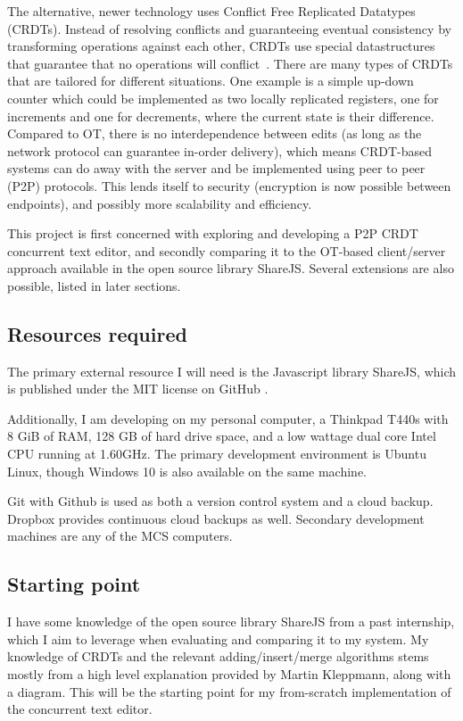 \documentclass[12pt,a4paper,twoside]{article}
\begin{document}
The alternative, newer technology uses Conflict Free Replicated Datatypes (CRDTs). Instead of resolving conflicts and guaranteeing eventual consistency by transforming operations against each other, CRDTs use special datastructures that guarantee that no operations will conflict~\cite{preguica2009commutative}. There are many types of CRDTs that are tailored for different situations. One example is a simple up-down counter which could be implemented as two locally replicated registers, one for increments and one for decrements, where the current state is their difference\cite{Shapiro2011}. Compared to OT, there is no interdependence between edits (as long as the network protocol can guarantee in-order delivery), which means CRDT-based systems can do away with the server and be implemented using peer to peer (P2P) protocols. This lends itself to security (encryption is now possible between endpoints),
and possibly more scalability and efficiency.

This project is first concerned with exploring and developing a P2P CRDT concurrent text editor, and secondly comparing it to the OT-based client/server approach available in the open source library ShareJS. Several extensions are also possible,
listed in later sections.

\subsection*{Resources required}

The primary external resource I will need is the Javascript library ShareJS, which is published under the MIT license on GitHub \cite{ShareJS}.

Additionally, I am developing on my personal computer, a Thinkpad T440s with 8 GiB of RAM,
128 GB of hard drive space, and a low wattage dual core Intel CPU running at 1.60GHz.
The primary development environment is Ubuntu Linux, though Windows 10 is also available 
on the same machine. 

Git with Github is used as both a version control system and a cloud backup. Dropbox  
provides continuous cloud backups as well. Secondary development machines are any of the MCS computers.

\subsection*{Starting point}

I have some knowledge of the open source library ShareJS from a past internship, which I aim to leverage when 
evaluating and comparing it to my system. My knowledge of CRDTs and the relevant adding/insert/merge
algorithms stems mostly from a high level explanation provided by Martin Kleppmann, along with a diagram.
This will be the starting point for my from-scratch implementation of the concurrent text editor.
\end{document}
